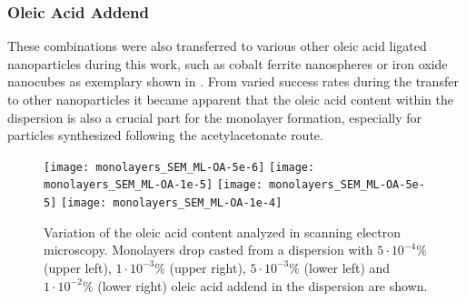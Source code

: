 \documentclass[\main/dresen_thesis.tex]{subfiles}
\begin{document}
  \subsubsection{Oleic Acid Addend}
    These combinations were also transferred to various other oleic acid ligated nanoparticles during this work, such as cobalt ferrite nanospheres or iron oxide nanocubes as exemplary shown in .
    From varied success rates during the transfer to other nanoparticles it became apparent that the oleic acid content within the dispersion is also a crucial part for the monolayer formation, especially for particles synthesized following the acetylacetonate route.

    \begin{figure}[tb]
      \centering
      \texttt{[image: monolayers\_SEM\_ML-OA-5e-6]}
      \texttt{[image: monolayers\_SEM\_ML-OA-1e-5]}
      \texttt{[image: monolayers\_SEM\_ML-OA-5e-5]}
      \texttt{[image: monolayers\_SEM\_ML-OA-1e-4]}
      \caption{\label{fig:monolayers:preparation:solventVariation:OAAddend}Variation of the oleic acid content analyzed in scanning electron microscopy. Monolayers drop casted from a dispersion with $5\cdot10^{-4} \unit{\%}$ (upper left), $1\cdot10^{-3} \unit{\%}$ (upper right), $5\cdot10^{-3} \unit{\%}$ (lower left) and $1\cdot10^{-2} \unit{\%}$ (lower right) oleic acid addend in the dispersion are shown.}
    \end{figure}
\end{document}
